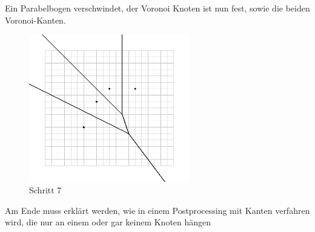 Ein Parabelbogen verschwindet, der Voronoi Knoten ist nun fest, sowie die beiden Voronoi-Kanten.

\newpage

\begin{figure}[h]
\begin{center}
\includegraphics[width=7cm]{capture7}
\end{center}
\caption{Schritt 7}
\label{fig:c7}
\end{figure}

Am Ende muss erklärt werden, wie in einem Postprocessing mit Kanten verfahren wird, die nur an einem oder gar keinem Knoten hängen 


